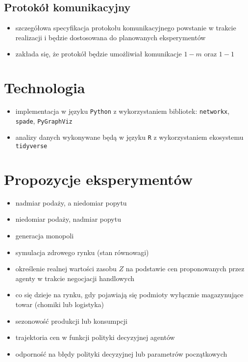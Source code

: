 \documentclass[]{article}
\providecommand{\tightlist}{%
  \setlength{\itemsep}{0pt}\setlength{\parskip}{0pt}}
\begin{document}
\hypertarget{protokuxf3ux142-komunikacyjny}{%
\subsection{Protokół
komunikacyjny}\label{protokuxf3ux142-komunikacyjny}}

\begin{itemize}
\tightlist
\item
  szczegółowa specyfikacja protokołu komunikacyjnego powstanie w trakcie
  realizacji i będzie dostosowana do planowanych eksperymentów
\item
  zakłada się, że protokół będzie umożliwiał komunikacje \(1-m\) oraz
  \(1-1\)
\end{itemize}

\hypertarget{technologia}{%
\section{Technologia}\label{technologia}}

\begin{itemize}
\tightlist
\item
  implementacja w języku \texttt{Python} z wykorzystaniem bibliotek:
  \texttt{networkx}, \texttt{spade}, \texttt{PyGraphViz}
\item
  analizy danych wykonywane będą w języku \texttt{R} z wykorzystaniem
  ekosystemu \texttt{tidyverse}
\end{itemize}

\hypertarget{propozycje-eksperymentuxf3w}{%
\section{Propozycje eksperymentów}\label{propozycje-eksperymentuxf3w}}

\begin{itemize}
\tightlist
\item
  nadmiar podaży, a niedomiar popytu
\item
  niedomiar podaży, nadmiar popytu
\item
  generacja monopoli
\item
  symulacja zdrowego rynku (stan równowagi)
\item
  określenie realnej wartości zasobu \(Z\) na podstawie cen
  proponowanych przez agenty w trakcie negocjacji handlowych
\item
  co się dzieje na rynku, gdy pojawiają się podmioty wyłącznie
  magazynujące towar (chomiki lub logistyka)
\item
  sezonowość produkcji lub konsumpcji
\item
  trajektoria cen w funkcji polityki decyzyjnej agentów
\item
  odporność na błędy polityki decyzyjnej lub parametrów początkowych
\end{itemize}
\end{document}
